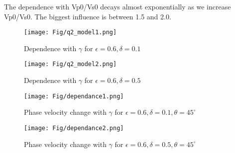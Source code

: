 \documentclass[10pt]{article}
\begin{document}
The dependence with Vp0/Vs0 decays almost exponentially as we increase Vp0/Vs0. The biggest
influence is between 1.5 and 2.0.

\begin{figure}
  \center
  \texttt{[image: Fig/q2\_model1.png]}
  \caption{Dependence with $\gamma$ for $\epsilon=0.6,\delta=0.1$}
\end{figure}

\begin{figure}
  \center
  \texttt{[image: Fig/q2\_model2.png]}
  \caption{Dependence with $\gamma$ for $\epsilon=0.6,\delta=0.5$}
\end{figure}

\begin{figure}
  \center
  \texttt{[image: Fig/dependance1.png]}
  \caption{Phase velocity change with $\gamma$ for $\epsilon=0.6,\delta=0.1, \theta=45^\circ$}
\end{figure}

\begin{figure}
  \center
  \texttt{[image: Fig/dependance2.png]}
  \caption{Phase velocity change with $\gamma$ for $\epsilon=0.6,\delta=0.5,\theta=45^\circ$}
\end{figure}
\end{document}
